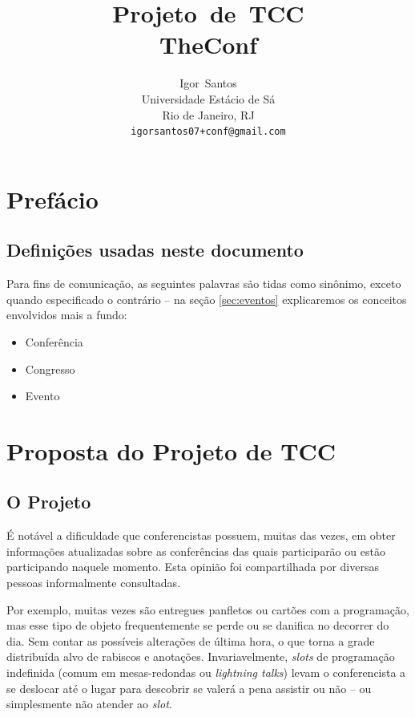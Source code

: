 \documentclass[a4paper]{abntex2}
\author{Igor~Santos\\
	Universidade Estácio de Sá\\
	Rio de Janeiro, RJ\\
	\texttt{igorsantos07+conf@gmail.com}
}
\title{Projeto~de~TCC\\TheConf}
\begin{document}
\maketitle


\chapter*{Prefácio}
\section*{Definições usadas neste documento}
Para fins de comunicação, as seguintes palavras são tidas como sinônimo, exceto quando especificado o contrário -- na seção \ref{sec:eventos} explicaremos os conceitos envolvidos mais a fundo:
\begin{itemize}
	\item Conferência
	\item Congresso
	\item Evento
\end{itemize}
\newpage

\tableofcontents

\chapter{Proposta do Projeto de TCC}

\section{O Projeto}

É notável a dificuldade que conferencistas possuem, muitas das vezes, em obter informações atualizadas sobre as conferências das quais participarão ou estão participando naquele momento. Esta opinião foi compartilhada por diversas pessoas informalmente consultadas.

Por exemplo, muitas vezes são entregues panfletos ou cartões com a programação, mas esse tipo de objeto frequentemente se perde ou se danifica no decorrer do dia. Sem contar as possíveis alterações de última hora, o que torna a grade distribuída alvo de rabiscos e anotações. Invariavelmente, \emph{slots} de programação indefinida (comum em mesas-redondas ou \emph{lightning talks}\footnotemark) levam o conferencista a se deslocar até o lugar para descobrir se valerá a pena assistir ou não -- ou simplesmente não atender ao \emph{slot}.
\end{document}
